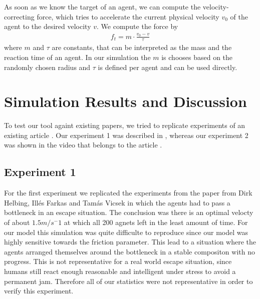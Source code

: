 \documentclass[11pt]{article}
\begin{document}
\begin{itemize}
	As soon as we know the target of an agent, we can compute the velocity-correcting force, which tries to accelerate the current physical velocity $v_0$ of the agent to the desired velocity $v$. We compute the force by    
	\begin{align*}
	  f_t = m \cdot \frac{v_0-v}{\tau}
	\end{align*}
	where $m$ and $\tau$ are constants, that can be interpreted as the mass and the reaction time of an agent. In our simulation the $m$ is chooses based on the randomly chosen radius and $\tau$ is defined per agent and can be used directly.
    
\end{itemize}

\section{Simulation Results and Discussion}
To test our tool againt existing papers, we tried to replicate experiments of an existing article \cite{Helbing}. Our experiment 1 was described in \cite{Helbing}, whereas our experiment 2 was shown in the video that belongs to the article \cite{Helbing}.  


\subsection{Experiment 1}

For the first experiment we replicated the experiments from the paper \cite{Simulating dynamical features of escape panic} from Dirk Helbing, Illés Farkas and Tamás Vicsek in which the agents had to pass a bottleneck in an escape situation. The conclusion was there is an optimal velocty of about $1.5 m/s^-1$ at which all 200 agnets left in the least amount of time. For our model this simulation was quite difficulte to reproduce since our model was highly sensitive towards the friction parameter. This lead to a situation where the agents arranged themselves around the bottleneck in a stable compositon with no progress. This is not representative for a real world escape situation, since humans still react enough reasonable and intelligent under stress to avoid a permanent jam. Therefore all of our statistics were not representative in order to verify this experiment.  
\end{document}
